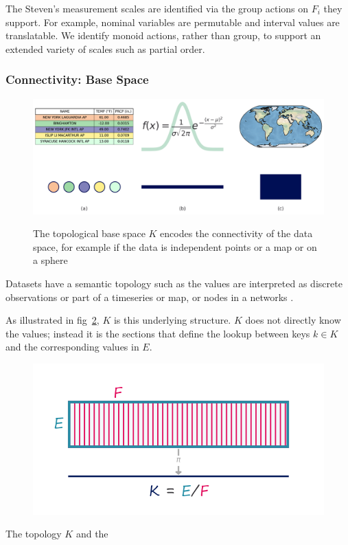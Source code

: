 \documentclass[../main.tex]{subfiles}
\begin{document}
The Steven's measurement scales are identified via the group actions on $F_{i}$  \cite{stevensTheoryScalesMeasurement1946, leaFormalizationMeasurementScale} they support. For example, nominal variables are permutable and interval values are translatable. We identify monoid actions, rather than group, to support an extended variety of scales such as partial order. 

\subsubsection{Connectivity: Base Space} 

\label{sec:base_data}
\begin{figure}[H]
    \includegraphics[width=\textwidth]{figures/math/k_different_types.png}
    \label{fig:base_space_types}
    \caption{The topological base space $K$ encodes the connectivity of the data space, for example if the data is independent points or a map or on a sphere}
\end{figure}

Datasets have a semantic topology such as the values are interpreted as discrete observations or part of a timeseries or map, or nodes in a networks \cite{munznerWhatDataAbstraction2014,geveci2012vtk}. %

As illustrated in fig~\ref{fig:base_space_div}, $K$ is this underlying structure. $K$ does not directly know the values; instead it is the sections that define the lookup between keys $k \in K$ and the corresponding values in $E$.

\begin{figure}[H]
    \label{fig:base_space_div}
    \includegraphics[width=.5\linewidth]{figures/math/k_qspace.png}
\end{figure}
The topology $K$ and the
\end{document}
